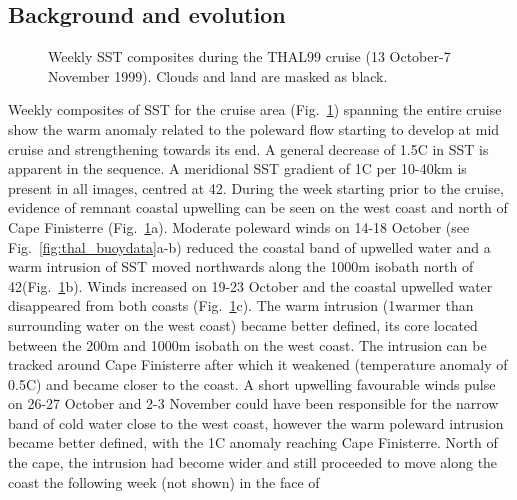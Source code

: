 \subsection{Background and evolution}
\begin{figure}
\abajocap \centering {}    \caption{Weekly SST
composites during the THAL99 cruise (13 October-7 November 1999).
Clouds and land are masked as black.} \arribacap
\label{fig:thal_sst}
\end{figure}
%
Weekly composites of SST for the cruise area
(Fig.~\ref{fig:thal_sst}) spanning the entire cruise show the warm
anomaly related to the poleward flow starting to develop at mid
cruise and strengthening towards its end. A general decrease of
1.5\deg C in SST is apparent in the sequence. A meridional SST
gradient of 1\deg C per 10-40km is present in all images, centred
at 42\deg. During the week starting prior to the cruise, evidence
of remnant coastal upwelling can be seen on the west coast and
north of Cape Finisterre (Fig.~\ref{fig:thal_sst}a). Moderate
poleward winds on 14-18 October (see
Fig.~\ref{fig:thal_buoydata}a-b) reduced the coastal band of
upwelled water and a warm intrusion of SST moved northwards along
the 1000m isobath north of 42\deg(Fig.~\ref{fig:thal_sst}b). Winds
increased on 19-23 October and the coastal upwelled water
disappeared from both coasts (Fig.~\ref{fig:thal_sst}c). The warm
intrusion (1\deg warmer than surrounding water on the west coast)
became better defined, its core located between the 200m and 1000m
isobath on the west coast. The intrusion can be tracked around
Cape Finisterre after which it weakened (temperature anomaly of
0.5\deg C) and became closer to the coast. A short upwelling
favourable winds pulse on 26-27 October and 2-3 November could
have been responsible for the narrow band of cold water close to
the west coast, however the warm poleward intrusion became better
defined, with the 1\deg C anomaly reaching Cape Finisterre. North
of the cape, the intrusion had become wider and still proceeded to
move along the coast the following week (not shown) in the face of

